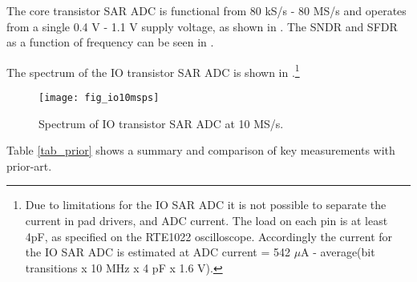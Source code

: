 The core transistor SAR ADC is functional from
80 kS/s - 80 MS/s and operates from a single  0.4 V - 1.1 V supply voltage, as
shown in . The SNDR and SFDR as a function of frequency can
be seen in .


The spectrum of the IO transistor SAR ADC is shown in
.\footnote{Due to limitations for the IO SAR ADC it is not possible to separate
the current in pad drivers, and ADC current. The
load on each pin is at least 4pF, as specified on the RTE1022
oscilloscope. Accordingly the current for the IO SAR ADC is estimated at
ADC current  =  542 $\mu$A - average(bit transitions x 10 MHz x 4 pF x
1.6 V).}
\begin{figure}[t]
\centerline{\texttt{[image: fig\_io10msps]}}
\caption{Spectrum of IO transistor SAR ADC at 10 MS/s.}
\label{fig_io}
\end{figure}
Table \ref{tab_prior} shows a summary and
comparison of key measurements with prior-art.

